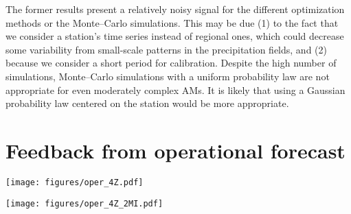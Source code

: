 \documentclass[review]{elsarticle}
\begin{document}
The former results present a relatively noisy signal for the different optimization methods or the Monte--Carlo simulations. This may be due (1) to the fact that we consider a station’s time series instead of regional ones, which could decrease some variability from small-scale patterns in the precipitation fields, and (2) because we consider a short period for calibration. Despite the high number of simulations, Monte--Carlo simulations with a uniform probability law are not appropriate for even moderately complex AMs. It is likely that using a Gaussian probability law centered on the station would be more appropriate.


\section{Feedback from operational forecast}
\label{sec:operational}

\begin{figure*}[hbt!]
	\vspace{-70pt}
	\texttt{[image: figures/oper\_4Z.pdf]}
	\caption{Forecasts for the Binn station (Fig. \ref{figure:variable_exploration}) over the period 2016--2018 obtained using the 4Zo method (Table \ref{table:methods}) with a lead time of three days. The distributions provided by the analog values are summarized by the $90^{th}$, $60^{th}$, and $30^{th}$ percentiles, as well as the maximum (crosses), all of them averaged over the four daily forecasts. Additionally, the four $90^{th}$ percentiles were also plotted to show the consistency / variability between the four daily forecasts. The shaded areas correspond to forecasts downtime.}
	\label{figure:operational_4z}
\end{figure*}

\begin{figure*}[hbt!]
	\vspace{-70pt}
	\texttt{[image: figures/oper\_4Z\_2MI.pdf]}
	\caption{Same as Fig. \ref{figure:operational_4z_2mi} but for the 4Zo-2MIo method (Table \ref{table:methods}) with a lead time of one day.}
	\label{figure:operational_4z_2mi}
\end{figure*}
\end{document}
